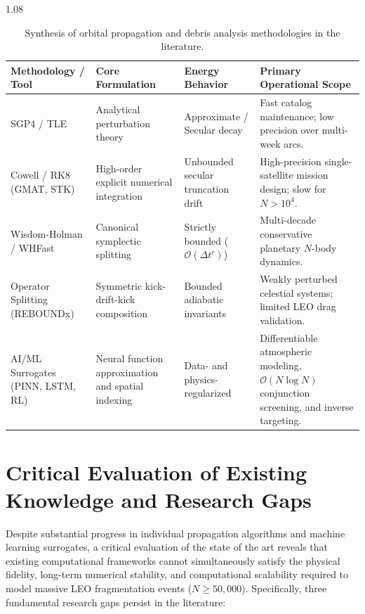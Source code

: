 \begin{table}[htbp]
\centering
\caption{Synthesis of orbital propagation and debris analysis methodologies in the literature.}
\label{tab:sota_synthesis}
\begin{spacing}{1.08}
\small
\begin{tabularx}{\textwidth}{
    >{\raggedright\arraybackslash}p{2.8cm}
    >{\raggedright\arraybackslash}p{3.6cm}
    >{\raggedright\arraybackslash}p{3.1cm}
    >{\raggedright\arraybackslash}X
}
\toprule
\textbf{Methodology / Tool} & \textbf{Core Formulation} & \textbf{Energy Behavior} & \textbf{Primary Operational Scope} \\
\midrule
SGP4 / TLE & Analytical perturbation theory & Approximate / Secular decay & Fast catalog maintenance; low precision over multi-week arcs. \\
\addlinespace[0.4em]
Cowell / RK8 (GMAT, STK) & High-order explicit numerical integration & Unbounded secular truncation drift & High-precision single-satellite mission design; slow for $N > 10^4$. \\
\addlinespace[0.4em]
Wisdom-Holman / WHFast & Canonical symplectic splitting & Strictly bounded ($\mathcal{O}(\Delta t^r)$) & Multi-decade conservative planetary $N$-body dynamics. \\
\addlinespace[0.4em]
Operator Splitting (REBOUNDx) & Symmetric kick-drift-kick composition & Bounded adiabatic invariants & Weakly perturbed celestial systems; limited LEO drag validation. \\
\addlinespace[0.4em]
AI/ML Surrogates (PINN, LSTM, RL) & Neural function approximation and spatial indexing & Data- and physics-regularized & Differentiable atmospheric modeling, $\mathcal{O}(N \log N)$ conjunction screening, and inverse targeting. \\
\bottomrule
\end{tabularx}
\end{spacing}
\end{table}

\section{Critical Evaluation of Existing Knowledge and Research Gaps}
\label{sec:niche}

Despite substantial progress in individual propagation algorithms and machine learning surrogates, a critical evaluation of the state of the art reveals that existing computational frameworks cannot simultaneously satisfy the physical fidelity, long-term numerical stability, and computational scalability required to model massive LEO fragmentation events ($N \ge 50,000$). Specifically, three fundamental research gaps persist in the literature:

